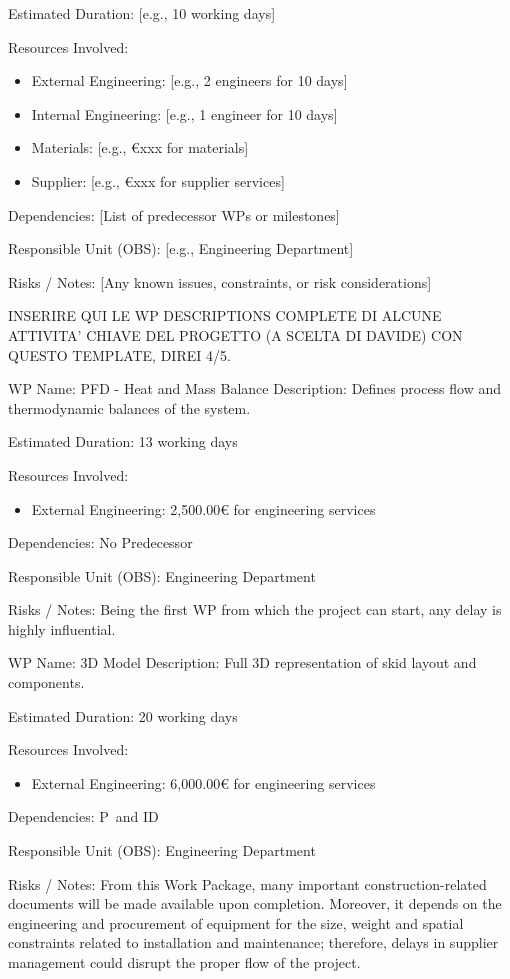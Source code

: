 \documentclass[12pt]{article}
\begin{document}
Estimated Duration: [e.g., 10 working days]

Resources Involved:
\begin{itemize}
        \item External Engineering: [e.g., 2 engineers for 10 days]
        \item Internal Engineering: [e.g., 1 engineer for 10 days]
        \item Materials: [e.g., €xxx for materials]
        \item Supplier: [e.g., €xxx for supplier services]
\end{itemize}

Dependencies:
[List of predecessor WPs or milestones]

Responsible Unit (OBS): [e.g., Engineering Department]

Risks / Notes:
[Any known issues, constraints, or risk considerations]

INSERIRE QUI LE WP DESCRIPTIONS COMPLETE DI ALCUNE ATTIVITA' CHIAVE DEL PROGETTO (A SCELTA DI DAVIDE) CON QUESTO TEMPLATE, DIREI 4/5.

WP Name: PFD - Heat and Mass Balance
Description:
Defines process flow and thermodynamic balances of the system.

Estimated Duration: 13 working days

Resources Involved:
\begin{itemize}
        \item External Engineering: 2,500.00€ for engineering services
\end{itemize}

Dependencies:
No Predecessor

Responsible Unit (OBS): Engineering Department

Risks / Notes:
Being the first WP from which the project can start, any delay is highly influential.

WP Name: 3D Model
Description:
Full 3D representation of skid layout and components.

Estimated Duration: 20 working days

Resources Involved:
\begin{itemize}
        \item External Engineering: 6,000.00€ for engineering services
\end{itemize}

Dependencies:
P\ and ID

Responsible Unit (OBS): Engineering Department

Risks / Notes:
From this Work Package, many important construction-related documents will be made available upon completion. Moreover, it depends on the engineering and procurement of equipment for the size, weight and spatial constraints related to installation and maintenance; therefore, delays in supplier management could disrupt the proper flow of the project.
\end{document}
